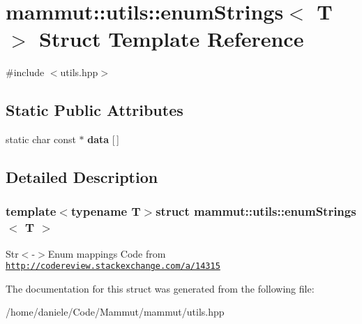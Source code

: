 \hypertarget{structmammut_1_1utils_1_1enumStrings}{\section{mammut\-:\-:utils\-:\-:enum\-Strings$<$ T $>$ Struct Template Reference}
\label{structmammut_1_1utils_1_1enumStrings}
}


{\ttfamily \#include $<$utils.\-hpp$>$}

\subsection*{Static Public Attributes}
\begin{DoxyCompactItemize}
\item 
\hypertarget{structmammut_1_1utils_1_1enumStrings_a2b0c0f1ba01a378a6dbc0b7e292db35c}{static char const $\ast$ {\bfseries data} \mbox{[}$\,$\mbox{]}}\label{structmammut_1_1utils_1_1enumStrings_a2b0c0f1ba01a378a6dbc0b7e292db35c}

\end{DoxyCompactItemize}


\subsection{Detailed Description}
\subsubsection*{template$<$typename T$>$struct mammut\-::utils\-::enum\-Strings$<$ T $>$}

Str$<$-\/$>$Enum mappings Code from \href{http://codereview.stackexchange.com/a/14315}{\tt http\-://codereview.\-stackexchange.\-com/a/14315} 

The documentation for this struct was generated from the following file\-:\begin{DoxyCompactItemize}
\item 
/home/daniele/\-Code/\-Mammut/mammut/utils.\-hpp\end{DoxyCompactItemize}

